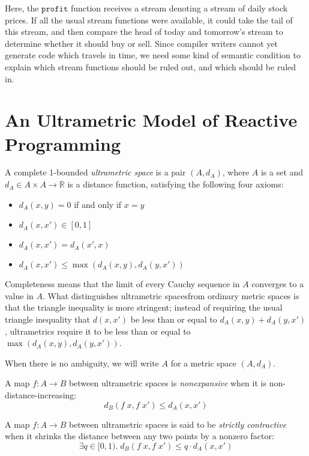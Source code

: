 \documentclass[preprint]{sigplanconf}
\newcommand{\R}{\mathbb{R}}
\newcommand{\term}[1]{\ensuremath{\mathtt{{#1}}}}
\begin{document}
Here, the \term{profit} function receives a stream denoting a stream
of daily stock prices. If all the usual stream functions were
available, it could take the tail of this stream, and then compare the
head of today and tomorrow's stream to determine whether it should buy
or sell. Since compiler writers cannot yet generate code which travels
in time, we need some kind of semantic condition to explain which 
stream functions should be ruled out, and which should be ruled in.  



\section{An Ultrametric Model of Reactive Programming}

A complete 1-bounded \emph{ultrametric space} is a pair $(A, d_A)$,
where $A$ is a set and $d_A \in A \times A \to \R$ is a distance
function, satisfying the following four axioms:

\begin{itemize}
\item $d_A(x, y) = 0$ if and only if $x = y$
\item $d_A(x, x') \in [0,1]$
\item $d_A(x, x') = d_A(x', x)$
\item $d_A(x, x') \leq \max(d_A(x, y), d_A(y, x'))$
\end{itemize}

Completeness means that the limit of every Cauchy sequence in $A$
converges to a value in $A$. What distinguishes ultrametric spacesfrom
ordinary metric spaces is that the triangle inequality is more
stringent; instead of requiring the usual triangle inequality that
$d(x,x')$ be less than or equal to $d_A(x, y) + d_A(y, x')$,
ultrametrics require it to be less than or equal to $\max(d_A(x, y),
d_A(y, x'))$.

When there is no ambiguity, we will write $A$ for a metric space $(A, d_A)$. 

A map $f : A \to B$ between ultrametric spaces is \emph{nonexpansive} when 
it is non-distance-increasing:
\begin{displaymath}
  d_B(f\;x, f\;x') \leq d_A(x, x')
\end{displaymath}

A map $f : A \to B$ between ultrametric spaces is said to be
\emph{strictly contractive} when it shrinks the distance between 
any two points by a nonzero factor:
\begin{displaymath}
  \exists q \in [0,1).\; d_B(f\;x, f\;x') \leq q \cdot d_A(x, x')
\end{displaymath}
\end{document}
